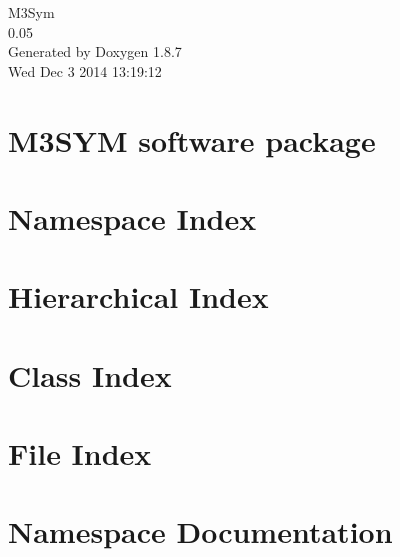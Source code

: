 \documentclass[twoside]{book}
\newcommand{\+}{\discretionary{\mbox{\scriptsize$\hookleftarrow$}}{}{}}
\newcommand{\clearemptydoublepage}{%
  \newpage{\pagestyle{empty}\cleardoublepage}%
}
\begin{document}
\hypersetup{pageanchor=false,
             bookmarks=true,
             bookmarksnumbered=true,
             pdfencoding=unicode
            }
\begin{titlepage}
\vspace*{7cm}
\begin{center}%
{\Large M3\+Sym \\[1ex]\large 0.\+05 }\\
\vspace*{1cm}
{\large Generated by Doxygen 1.8.7}\\
\vspace*{0.5cm}
{\small Wed Dec 3 2014 13:19:12}\\
\end{center}
\end{titlepage}
\clearemptydoublepage
\tableofcontents
\clearemptydoublepage
{}
\hypersetup{pageanchor=true}

\chapter{M3\+S\+Y\+M software package}
\label{index}\hypertarget{index}{}
\chapter{Namespace Index}

\chapter{Hierarchical Index}

\chapter{Class Index}

\chapter{File Index}

\chapter{Namespace Documentation}



\end{document}
